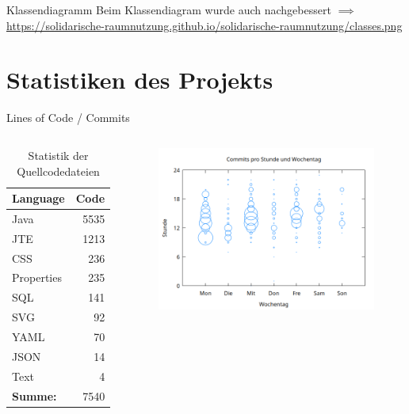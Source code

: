 \documentclass{sdqbeamer}
\begin{document}
    \begin{frame}{Klassendiagramm}
        Beim Klassendiagram wurde auch nachgebessert
        \hfill \break
        \hfill \break
        $\implies$ \url{https://solidarische-raumnutzung.github.io/solidarische-raumnutzung/classes.png} 
    \end{frame}
    
    \section{Statistiken des Projekts}
    
    \begin{frame}{Lines of Code / Commits}
        \thispagestyle{plain}
        \begin{columns}
             \begin{table}[h]
        \centering
        \begin{tabular}{lr}
            \toprule
            Language & Code \\
            \midrule
            Java        & 5535 \\
            JTE        & 1213 \\
            CSS         & 236  \\
            Properties  & 235  \\
            SQL        & 141  \\
            SVG        & 92   \\
            YAML       & 70   \\
            JSON       & 14   \\
            Text       & 4    \\
            \midrule
            \textbf{Summe:} & 7540 \\
            \bottomrule
        \end{tabular}
        \caption{Statistik der Quellcodedateien}
        \label{tab:code_stats}
    \end{table}
        \begin{figure}
            \centering
            \includegraphics[width=1\linewidth]{hours.png}

\end{figure}
\end{columns}
\end{frame}
\end{document}
